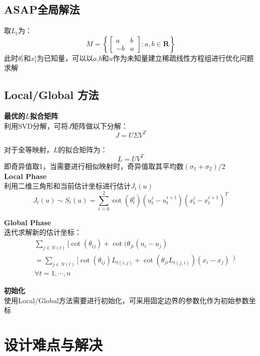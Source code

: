 \documentclass[14pt]{scrartcl} %
\begin{document}
\subsection{ASAP全局解法}
取$L_t$为：
\begin{equation}
M=\left\{\begin{bmatrix}a&b\\-b&a\end{bmatrix}:a,b\in \boldsymbol R \right\}
\end{equation}
此时$\theta_t^i$和$x_t^i$为已知量，可以以$a$,$b$和$u$作为未知量建立稀疏线性方程组进行优化问题求解

\subsection{Local/Global 方法}
\textbf{最优的$L$拟合矩阵}\\
利用SVD分解，可将$J$矩阵做以下分解：
\begin{equation}
J=U\Sigma V^T
\end{equation}

对于全等映射，$L$的拟合矩阵为：
\begin{equation}
L=UV^T
\end{equation}
即奇异值取1，当需要进行相似映射时，奇异值取其平均数$(\sigma_1+\sigma_2)/2$\\

\textbf{Local Phase}\\
利用二维三角形和当前估计坐标进行估计$J_t(u)$
\begin{equation}
J_t(u)\sim S_t(u)=\sum\limits_{t=0}^2 \cot(\theta_t^i)(u_t^i-u_t^{i+1})(x_t^i-x_t^{i+1})^T
\end{equation}

\textbf{Global Phase}\\
迭代求解新的估计坐标：
\begin{equation}
\begin{aligned}
&\sum\limits_{j\in N(t)}[\cot(\theta_{ij})+\cot(\theta_{ji}(u_i-u_j)\\
&=\sum\limits_{j\in N(t)}[\cot(\theta_{ij})L_{t(i,j)}+\cot(\theta_{ji}L_{t(j,i)})(x_i-x_j)\\
&\forall t=1,\cdots,n
\end{aligned}
)\end{equation}

\textbf{初始化}\\
使用Local/Global方法需要进行初始化，可采用固定边界的参数化作为初始参数坐标

\pagebreak
\section{设计难点与解决}
\end{document}
